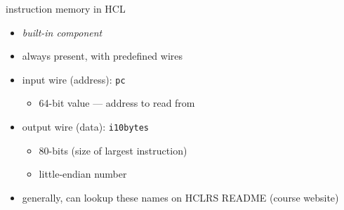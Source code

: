 \begin{frame}{instruction memory in HCL}
\begin{itemize}
\item \textit{built-in component}
\item always present, with predefined wires
\vspace{.5cm}
\item input wire (address): {\tt pc}
    \begin{itemize}
    \item 64-bit value --- address to read from
    \end{itemize}
\item output wire (data): {\tt i10bytes}
    \begin{itemize}
    \item 80-bits (size of largest instruction)
    \item little-endian number
    \end{itemize}
\item generally, can lookup these names on HCLRS README (course website)
\end{itemize}
\end{frame}
